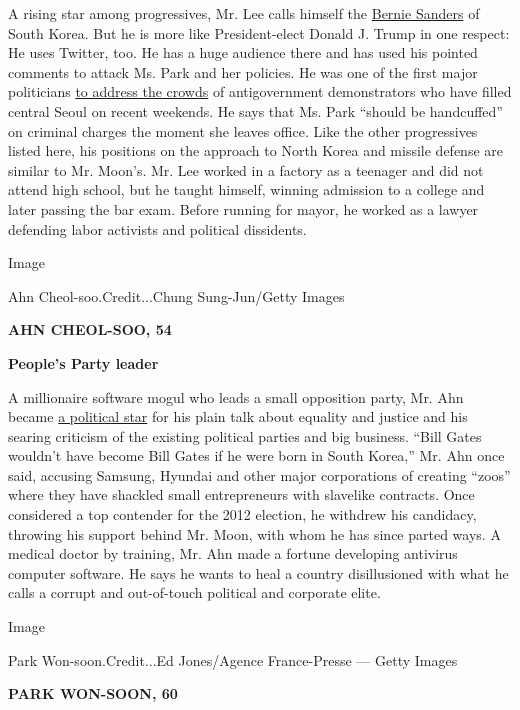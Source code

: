 A rising star among progressives, Mr. Lee calls himself the
\href{http://www.nytimes.com/topic/person/bernard-sanders}{Bernie
Sanders} of South Korea. But he is more like President-elect Donald J.
Trump in one respect: He uses Twitter, too. He has a huge audience there
and has used his pointed comments to attack Ms. Park and her policies.
He was one of the first major politicians
\href{http://www.nytimes.com/2016/10/31/world/asia/south-korea-choi-soon-sil.html}{to
address the crowds} of antigovernment demonstrators who have filled
central Seoul on recent weekends. He says that Ms. Park ``should be
handcuffed'' on criminal charges the moment she leaves office. Like the
other progressives listed here, his positions on the approach to North
Korea and missile defense are similar to Mr. Moon's. Mr. Lee worked in a
factory as a teenager and did not attend high school, but he taught
himself, winning admission to a college and later passing the bar exam.
Before running for mayor, he worked as a lawyer defending labor
activists and political dissidents.

Image

Ahn Cheol-soo.Credit...Chung Sung-Jun/Getty Images

\textbf{AHN CHEOL-SOO, 54}

\textbf{People's Party leader}

A millionaire software mogul who leads a small opposition party, Mr. Ahn
became
\href{http://www.nytimes.com/2011/11/20/world/asia/a-new-voice-grips-south-korea-with-plain-talk-about-inequality-and-justice.html}{a
political star} for his plain talk about equality and justice and his
searing criticism of the existing political parties and big business.
``Bill Gates wouldn't have become Bill Gates if he were born in South
Korea,'' Mr. Ahn once said, accusing Samsung, Hyundai and other major
corporations of creating ``zoos'' where they have shackled small
entrepreneurs with slavelike contracts. Once considered a top contender
for the 2012 election, he withdrew his candidacy, throwing his support
behind Mr. Moon, with whom he has since parted ways. A medical doctor by
training, Mr. Ahn made a fortune developing antivirus computer software.
He says he wants to heal a country disillusioned with what he calls a
corrupt and out-of-touch political and corporate elite.

Image

Park Won-soon.Credit...Ed Jones/Agence France-Presse --- Getty Images

\textbf{PARK WON-SOON, 60}

